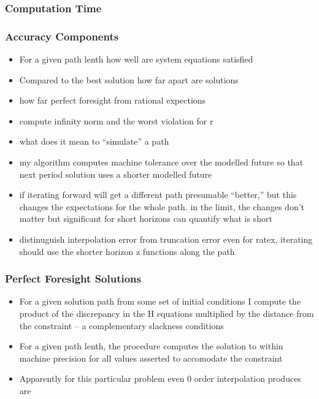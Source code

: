 \documentclass{beamer}
\begin{document}
    \begin{frame}
      \frametitle{Computation Time}


 {\tiny
      \begin{minipage}{1.0\linewidth}
      
      \end{minipage}
 }
    \end{frame}
    \begin{frame}
      \frametitle{Accuracy Components}
      \begin{itemize}
      \item For a given path lenth how well are system equations satisfied
      \item Compared to the best solution how far apart are solutions
      \item how far perfect foresight from rational expections
      \item compute infinity norm and the worst violation for r
      \item what does it mean to ``simulate'' a path
      \item my algorithm computes machine tolerance over the modelled future so that next period solution uses a shorter modelled future
      \item if iterating forward will get a different path presumable ``better,'' but this changes the expectations for the whole path. in the limit, the
changes don't matter but significant for short horizons can quantify what is short
\item distinuguish interpolation error from truncation error even for ratex, iterating should use the shorter horizon z functions along the path
      \end{itemize}
    \end{frame}
    \begin{frame}
      \frametitle{Perfect Foresight Solutions}
      \begin{itemize}
\item For a given solution path  from some set of initial conditions 
I compute the product of the discrepancy in the H equations multiplied by 
the distance from the constraint -- a complementary slackness conditions
      \item For a given path lenth, the procedure computes the solution to within machine precision for all values asserted to accomodate the constraint
      \item Apparently for this particular problem  even 0 order interpolation produces
are 
      \end{itemize}
    \end{frame}
\end{document}
